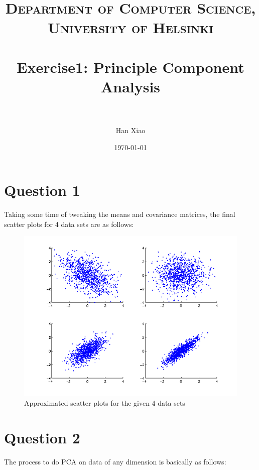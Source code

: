 \documentclass[paper=a4, fontsize=11pt]{scrartcl} %
\title{	
\normalfont \normalsize 
\textsc{Department of Computer Science, University of Helsinki} \\ [25pt] %
\horrule{0.5pt} \\[0.4cm] %
\huge Exercise1: Principle Component Analysis \\ %
\horrule{2pt} \\[0.5cm] %
}
\author{Han Xiao} %
\date{\normalsize\today} %
\numberwithin{equation}{section} %
\numberwithin{figure}{section} %
\numberwithin{table}{section} %
\begin{document}
\maketitle %


\section{Question 1}

Taking some time of tweaking the means and covariance matrices, the final scatter plots for 4 data sets are as follows:

\begin{figure}[H]
  \centering
  \includegraphics[scale=.7]{scatter_points}
  \caption{Approximated scatter plots for the given 4 data sets}
\end{figure}





\section{Question 2}
The process to do PCA on data of any dimension is basically as follows:
\end{document}
